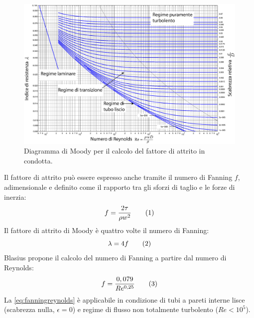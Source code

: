\begin{figure}[htbp] %
    \centering
    \includegraphics[width=.9\textwidth]{fig/fluidodinamica/moody.eps}
    \caption{Diagramma di Moody per il calcolo del fattore di attrito in condotta.} 
    \label{fig:moody}
\end{figure}

Il fattore di attrito può essere espresso anche tramite il numero di Fanning \(f\), adimensionale e definito come il rapporto tra gli sforzi di taglio e le forze di inerzia:
\[f=\dfrac{2\tau}{\rho w^2} \addtag \label{fanning} \]
Il fattore di attrito di Moody è quattro volte il numero di Fanning:
\[\lambda = 4f \addtag \label{eq:fanningmoody} \]
Blasius propone il calcolo del numero di Fanning a partire dal numero di Reynolds:
\[f=\dfrac{0,079}{Re^{0,25}} \addtag \label{eq:fanningreynolds} \]
La \eqref{eq:fanningreynolds} è applicabile in condizione di tubi a pareti interne lisce (scabrezza nulla, \(\epsilon=0\)) e regime di flusso non totalmente turbolento (\(Re<10^5\)).
